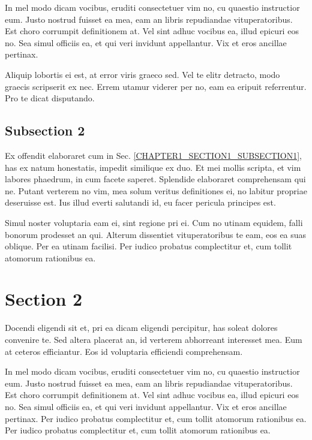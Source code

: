 In mel modo dicam vocibus, eruditi consectetuer vim no, cu quaestio 
instructior eum. Justo nostrud fuisset ea mea, eam an libris repudiandae 
vituperatoribus. Est choro corrumpit definitionem at. Vel sint adhuc vocibus 
ea, illud epicuri eos no. Sea simul officiis ea, et qui veri invidunt 
appellantur. Vix et eros ancillae pertinax. \cite{CPMD_02,Crystal09_01,Crystal09_02,DMOL3_01,HPL_01}

Aliquip lobortis ei est, at error viris graeco sed. Vel te elitr detracto, 
modo graecis scripserit ex nec. Errem utamur viderer per no, eam ea eripuit 
referrentur. Pro te dicat disputando. 

\subsection{Subsection 2}\label{CHAPTER1_SECTION1_SUBSECTION2}

Ex offendit elaboraret cum in Sec. \ref{CHAPTER1_SECTION1_SUBSECTION1}, 
has ex natum honestatis, impedit similique ex duo. Et mei mollis scripta, 
et vim labores phaedrum, in cum facete saperet. Splendide elaboraret 
comprehensam qui ne. Putant verterem no vim, mea solum veritus definitiones 
ei, no labitur propriae deseruisse est. Ius illud everti salutandi id, eu 
facer pericula principes est.

Simul noster voluptaria eam ei, sint regione pri ei. Cum no utinam equidem, 
falli bonorum prodesset an qui. Alterum dissentiet vituperatoribus te eam, 
eos ea suas oblique. Per ea utinam facilisi. \cite{DMOL3_02,HPL_01,HPL_02}
Per iudico probatus complectitur et, cum tollit atomorum rationibus ea.

\section{Section 2}\label{CHAPTER1_SECTION2}

Docendi eligendi sit et, pri ea dicam eligendi percipitur, has soleat 
dolores convenire te. Sed altera placerat an, id verterem abhorreant 
interesset mea. Eum at ceteros efficiantur. Eos id voluptaria efficiendi 
comprehensam. \cite{HPL_DGEMM_01,HPL_DGEMM_02}

In mel modo dicam vocibus, eruditi consectetuer vim no, cu quaestio 
instructior eum. Justo nostrud fuisset ea mea, eam an libris repudiandae 
vituperatoribus. Est choro corrumpit definitionem at. Vel sint adhuc vocibus 
ea, illud epicuri eos no. Sea simul officiis ea, et qui veri invidunt 
appellantur. Vix et eros ancillae pertinax. 
\cite{GROMACS4,GULP_01,GULP_02,HYPRE_01,LAMMPS_01}
Per iudico probatus complectitur et, cum tollit atomorum rationibus ea.
Per iudico probatus complectitur et, cum tollit atomorum rationibus ea.

